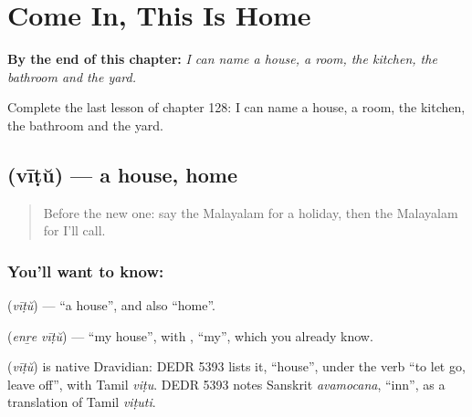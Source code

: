 
\chapter{Come In, This Is Home}
\label{ch:ml-come-in-this-is-home}

\begin{chapteropening}
\textbf{By the end of this chapter:} \emph{I can name a house, a room, the kitchen, the bathroom and the yard.}

Complete the last lesson of chapter 128: I can name a house, a room, the kitchen, the bathroom and the yard.
\end{chapteropening}

\section[\texorpdfstring{\ml{വീട്} (vīṭŭ)}{വീട് (vīṭŭ)}]{ (vīṭŭ) — a house, home}

\label{lesson:ML-C128-house}



\begin{quote}
Before the new one: say the Malayalam for a holiday, then the Malayalam for I'll call.
\end{quote}

\subsection*{You'll want to know: }
\textbf{} (\emph{vīṭŭ}) — \textquotedblleft{}a house\textquotedblright{}, and also \textquotedblleft{}home\textquotedblright{}.

\textbf{ } (\emph{enṟe vīṭŭ}) — \textquotedblleft{}my house\textquotedblright{}, with \textbf{}, \textquotedblleft{}my\textquotedblright{}, which you already know.

\begin{cousinweb}
\textbf{} (\emph{vīṭŭ}) is native Dravidian: DEDR 5393 lists it, \textquotedblleft{}house\textquotedblright{}, under the verb \textquotedblleft{}to let go, leave off\textquotedblright{}, with Tamil \emph{viṭu}. DEDR 5393 notes Sanskrit \emph{avamocana}, \textquotedblleft{}inn\textquotedblright{}, as a translation of Tamil \emph{viṭuti}.
\end{cousinweb}

